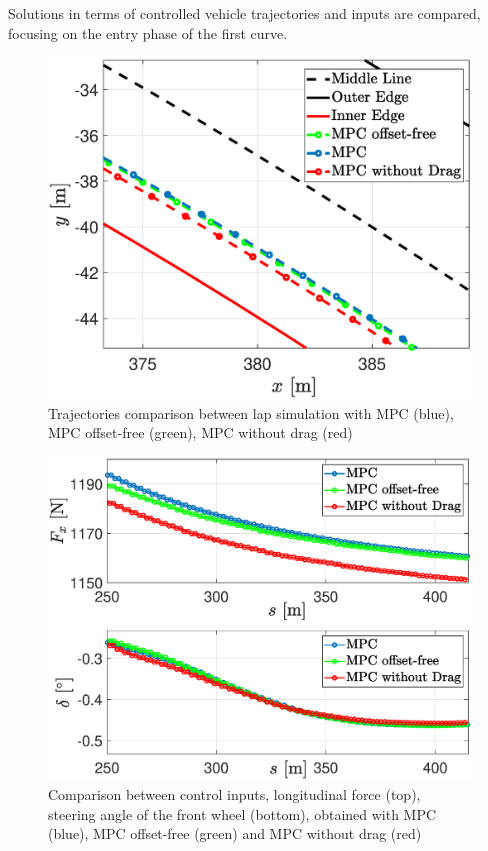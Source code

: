 \documentclass[conference]{IEEEtran} %
\begin{document}
Solutions in terms of controlled vehicle trajectories and inputs are compared, focusing on the entry phase of the first curve.

\begin{figure}[htb] \centering
    \includegraphics[width=1.\linewidth]{Trajectories2}
	\caption{Trajectories comparison between lap simulation with MPC (blue), MPC offset-free (green), MPC without drag (red)}
	\label{fig:Trajectories2}
\end{figure}

\begin{figure}[htb] \centering
	\includegraphics[width=1.\linewidth]{steer_fx} %
	\caption{Comparison between control inputs, longitudinal force (top), steering angle of the front wheel (bottom), obtained with MPC (blue), MPC offset-free (green) and MPC without drag (red)}
	\label{fig:steer_fx}
\end{figure}
\end{document}
